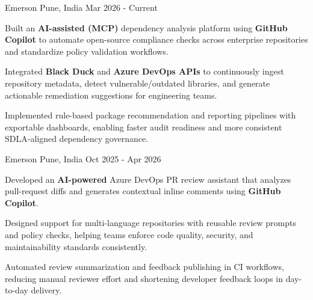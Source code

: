 

\begin{cventries}

  \cventry
    {Emerson} %
    {} %
    {Pune, India} %
    {Mar 2026 - Current} %
    {
      \begin{cvitems} %
        \item {Built an \textbf{AI-assisted (MCP)} dependency analysis platform using \textbf{GitHub Copilot} to automate open-source compliance checks across enterprise repositories and standardize policy validation workflows.}
        \item {Integrated \textbf{Black Duck} and \textbf{Azure DevOps APIs} to continuously ingest repository metadata, detect vulnerable/outdated libraries, and generate actionable remediation suggestions for engineering teams.}
        \item {Implemented rule-based package recommendation and reporting pipelines with exportable dashboards, enabling faster audit readiness and more consistent SDLA-aligned dependency governance.}
      \end{cvitems}
    }

  \cventry
    {Emerson} %
    {} %
    {Pune, India} %
    {Oct 2025 - Apr 2026} %
    {
      \begin{cvitems} %
        \item {Developed an \textbf{AI-powered} Azure DevOps PR review assistant that analyzes pull-request diffs and generates contextual inline comments using \textbf{GitHub Copilot}.}
        \item {Designed support for multi-language repositories with reusable review prompts and policy checks, helping teams enforce code quality, security, and maintainability standards consistently.}
        \item {Automated review summarization and feedback publishing in CI workflows, reducing manual reviewer effort and shortening developer feedback loops in day-to-day delivery.}
      \end{cvitems}
    }


\end{cventries}
